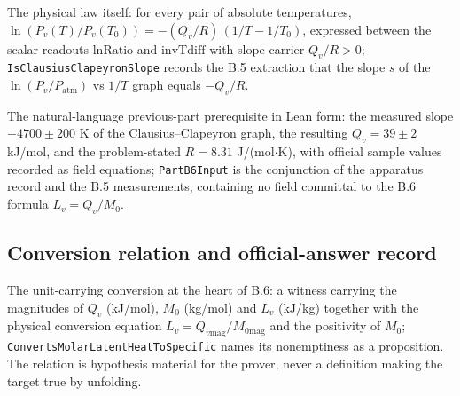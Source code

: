 \begin{definition}
\label{def:IPhO2026Problems_problem_IPhO_2026_4_B_6:SatisfiesClausiusClapeyron}
The physical law itself: for every pair of absolute temperatures,
$\ln(P_v(T)/P_v(T_0)) = -(Q_v/R)\,(1/T - 1/T_0)$, expressed between the
scalar readouts $\mathrm{lnRatio}$ and $\mathrm{invTdiff}$ with slope carrier
$Q_v/R > 0$; \texttt{IsClausiusClapeyronSlope} records the B.5 extraction
that the slope $s$ of the $\ln(P_v/P_{\mathrm{atm}})$ vs $1/T$ graph equals
$-Q_v/R$.
\end{definition}

\begin{definition}
\label{def:IPhO2026Problems_problem_IPhO_2026_4_B_6:PartB5Measurements}
The natural-language previous-part prerequisite in Lean form: the measured
slope $-4700 \pm 200$ K of the Clausius--Clapeyron graph, the resulting
$Q_v = 39 \pm 2$ kJ/mol, and the problem-stated $R = 8.31$ J/(mol$\cdot$K),
with official sample values recorded as field equations;
\texttt{PartB6Input} is the conjunction of the apparatus record and the
B.5 measurements, containing no field committal to the B.6 formula
$L_v = Q_v/M_0$.
\end{definition}

\subsection*{Conversion relation and official-answer record}

\begin{definition}
\label{def:IPhO2026Problems_problem_IPhO_2026_4_B_6:IsSpecificLatentHeatOf}
The unit-carrying conversion at the heart of B.6: a witness carrying the
magnitudes of $Q_v$ (kJ/mol), $M_0$ (kg/mol) and $L_v$ (kJ/kg) together
with the physical conversion equation
$L_v = Q_{v\mathrm{mag}} / M_{0\mathrm{mag}}$ and the positivity of
$M_0$; \texttt{ConvertsMolarLatentHeatToSpecific} names its nonemptiness as
a proposition. The relation is hypothesis material for the prover, never a
definition making the target true by unfolding.
\end{definition}

